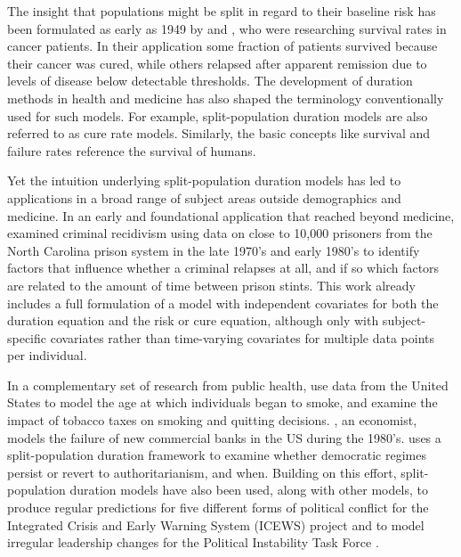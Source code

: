 \documentclass[12pt,onesided]{amsart}
\begin{document}
The insight that populations might be split in regard to their baseline
risk has been formulated as early as 1949 by \citet{boag1949maximum} and \citet{berkson1952survival}, who were researching survival rates in cancer patients. In
their application some fraction of patients survived because their
cancer was cured, while others relapsed after apparent remission due to
levels of disease below detectable thresholds. The development of
duration methods in health and medicine has also shaped the terminology
conventionally used for such models. For example, split-population
duration models are also referred to as cure rate models. Similarly, the
basic concepts like survival and failure rates reference the survival of
humans.

Yet the intuition underlying split-population duration models has led to
applications in a broad range of subject areas outside demographics and
medicine. In an early and foundational application that reached beyond
medicine, \citet{schmidt1989predicting} examined criminal recidivism using
data on close to 10,000 prisoners from the North Carolina prison system
in the late 1970's and early 1980's to identify factors that influence
whether a criminal relapses at all, and if so which factors are related
to the amount of time between prison stints. This work already includes
a full formulation of a model with independent covariates for both the
duration equation and the risk or cure equation, although only with
subject-specific covariates rather than time-varying covariates for
multiple data points per individual.

In a complementary set of research from public health, \citet{douglas1994hazard} use data from the United States to model the age at
which individuals began to smoke, and \citet{forster2001role} examine
the impact of tobacco taxes on smoking and quitting decisions. \citet{deyoung2003failure}, an economist, models the failure of new commercial banks in the
US during the 1980's. \citet{svolik2008authoritarian} uses a split-population duration
framework to examine whether democratic regimes persist or revert to
authoritarianism, and when. Building on this effort, split-population
duration models have also been used, along with other models, to produce
regular predictions for five different forms of political conflict for
the Integrated Crisis and Early Warning System (ICEWS) project \citep{ward2013learning} and to model irregular leadership changes for the Political
Instability Task Force \citep[PITF;][]{beger2014ensemble}.
\end{document}
